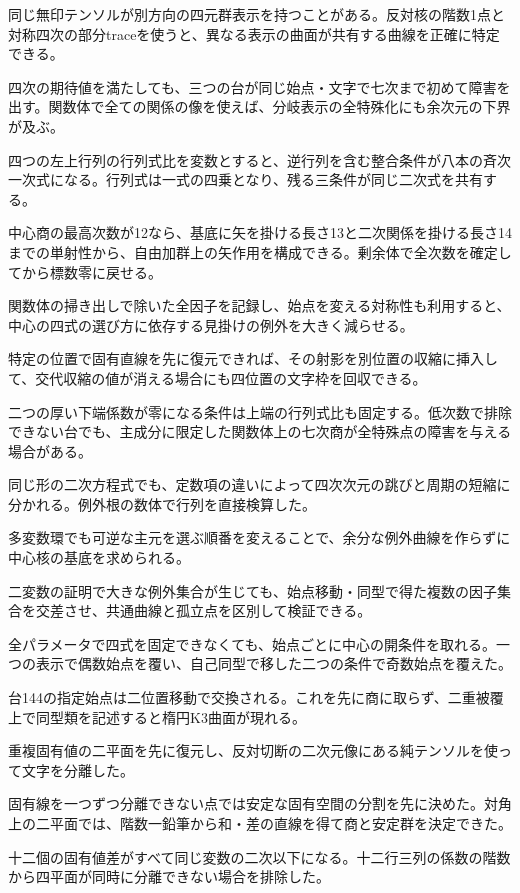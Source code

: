 \documentclass[11pt,a4paper]{ltjsarticle}
\begin{document}
同じ無印テンソルが別方向の四元群表示を持つことがある。反対核の階数1点と対称四次の部分traceを使うと、異なる表示の曲面が共有する曲線を正確に特定できる。

四次の期待値を満たしても、三つの台が同じ始点・文字で七次まで初めて障害を出す。関数体で全ての関係の像を使えば、分岐表示の全特殊化にも余次元の下界が及ぶ。

四つの左上行列の行列式比を変数とすると、逆行列を含む整合条件が八本の斉次一次式になる。行列式は一式の四乗となり、残る三条件が同じ二次式を共有する。

中心商の最高次数が12なら、基底に矢を掛ける長さ13と二次関係を掛ける長さ14までの単射性から、自由加群上の矢作用を構成できる。剰余体で全次数を確定してから標数零に戻せる。

関数体の掃き出しで除いた全因子を記録し、始点を変える対称性も利用すると、中心の四式の選び方に依存する見掛けの例外を大きく減らせる。

特定の位置で固有直線を先に復元できれば、その射影を別位置の収縮に挿入して、交代収縮の値が消える場合にも四位置の文字枠を回収できる。

二つの厚い下端係数が零になる条件は上端の行列式比も固定する。低次数で排除できない台でも、主成分に限定した関数体上の七次商が全特殊点の障害を与える場合がある。

同じ形の二次方程式でも、定数項の違いによって四次次元の跳びと周期の短縮に分かれる。例外根の数体で行列を直接検算した。

多変数環でも可逆な主元を選ぶ順番を変えることで、余分な例外曲線を作らずに中心核の基底を求められる。

二変数の証明で大きな例外集合が生じても、始点移動・同型で得た複数の因子集合を交差させ、共通曲線と孤立点を区別して検証できる。

全パラメータで四式を固定できなくても、始点ごとに中心の開条件を取れる。一つの表示で偶数始点を覆い、自己同型で移した二つの条件で奇数始点を覆えた。

台144の指定始点は二位置移動で交換される。これを先に商に取らず、二重被覆上で同型類を記述すると楕円K3曲面が現れる。

重複固有値の二平面を先に復元し、反対切断の二次元像にある純テンソルを使って文字を分離した。

固有線を一つずつ分離できない点では安定な固有空間の分割を先に決めた。対角上の二平面では、階数一鉛筆から和・差の直線を得て商と安定群を決定できた。

十二個の固有値差がすべて同じ変数の二次以下になる。十二行三列の係数の階数から四平面が同時に分離できない場合を排除した。
\end{document}
